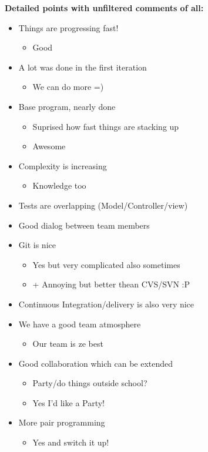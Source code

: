 \documentclass[a4paper]{article}
\begin{document}
\textbf{Detailed points with unfiltered comments of all:}
\begin{itemize}
	\item Things are progressing fast!
	\begin{itemize}
		\item Good
	\end{itemize}
	\item A lot was done in the first iteration
	\begin{itemize}
		\item We can do more =)
	\end{itemize}
	\item Base program, nearly done
	\begin{itemize}
		\item Suprised how fast things are stacking up
		\item Awesome
	\end{itemize}
	\item Complexity is increasing
	\begin{itemize}
		\item Knowledge too
	\end{itemize}
	\item Tests are overlapping (Model/Controller/view)
	\item Good dialog between team members
	\item Git is nice
	\begin{itemize}
		\item Yes but very complicated also sometimes
		\item + Annoying but better thean CVS/SVN :P
	\end{itemize}
	\item Continuous Integration/delivery is also very nice
	\item We have a good team atmosphere
	\begin{itemize}
		\item Our team is ze best
	\end{itemize}
	\item Good collaboration which can be extended
	\begin{itemize}
		\item Party/do things outside school?
		\item Yes I'd like a Party!
	\end{itemize}
	\item More pair programming
	\begin{itemize}
		\item Yes and switch it up!

\end{itemize}
\end{itemize}
\end{document}
